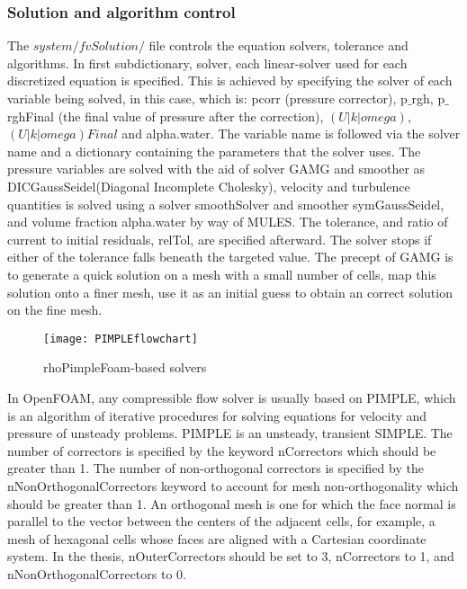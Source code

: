 \subsubsection{Solution and algorithm control}
The $\textit{system/fvSolution/}$ file controls the equation solvers, tolerance and algorithms. 
In first subdictionary, solver, each linear-solver used for each discretized equation is specified. This is achieved by
specifying the solver of each variable being solved, in this case, which is: pcorr (pressure corrector), p$\_$rgh, p$\_$rghFinal
(the final value of pressure after the correction), $(U|k|omega)$, $(U|k|omega)Final$ and alpha.water. The variable name is followed via the
solver name and a dictionary containing the parameters that the solver uses. The pressure variables are solved with the aid of solver GAMG 
and smoother as DICGaussSeidel(Diagonal Incomplete Cholesky), velocity and turbulence quantities is solved using a solver 
smoothSolver and smoother symGaussSeidel, and volume fraction alpha.water by way of MULES. The tolerance, and ratio of 
current to initial residuals, relTol, are specified afterward. The solver stops if either of the tolerance falls 
beneath the targeted value. The precept of GAMG is to generate a quick solution on a mesh with a small number of cells, 
map this solution onto a finer mesh, use it as an initial guess to obtain an correct solution on the fine mesh.\\
\begin{figure}[H]
    \centering
    \texttt{[image: PIMPLEflowchart]}
    \caption{rhoPimpleFoam-based solvers}
    \label{fig:fig16}
\end{figure}

In OpenFOAM, any compressible flow solver is usually based on PIMPLE, which is an algorithm of iterative procedures 
for solving equations for velocity and pressure of unsteady problems. PIMPLE is an unsteady, transient SIMPLE.
The number of correctors is specified by the keyword nCorrectors which should be greater than 1. The number of non-orthogonal correctors is specified by the 
nNonOrthogonalCorrectors keyword to account for mesh non-orthogonality which should be greater than 1. An orthogonal mesh is one for which the face normal 
is parallel to the vector between the centers of the adjacent cells, for example, a mesh of hexagonal cells whose faces are 
aligned with a Cartesian coordinate system. In the thesis, nOuterCorrectors should be set to 3, nCorrectors to 1, and nNonOrthogonalCorrectors to 0.
